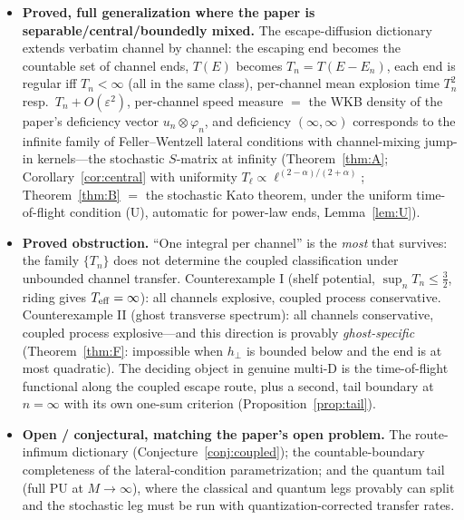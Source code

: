 \documentclass[11pt]{article}
\theoremstyle{remark}
\begin{document}
\begin{itemize}
\item \textbf{Proved, full generalization where the paper is
separable/central/boundedly mixed.}  The escape-diffusion dictionary
extends verbatim channel by channel: the escaping end becomes the
countable set of channel ends, $T(E)$ becomes $T_{n}=T(E-E_{n})$, each
end is regular iff $T_{n}<\infty$ (all in the same class), per-channel
mean explosion time $T_{n}^{2}$ resp.\ $T_{n}+O(\varepsilon^{2})$,
per-channel speed measure $=$ the WKB density of the paper's deficiency
vector $u_{n}\otimes\varphi_{n}$, and deficiency $(\infty,\infty)$
corresponds to the infinite family of Feller--Wentzell lateral
conditions with channel-mixing jump-in kernels---the stochastic
$S$-matrix at infinity (Theorem~\ref{thm:A}; Corollary~\ref{cor:central}
with uniformity $T_{\ell}\propto\ell^{(2-\alpha)/(2+\alpha)}$;
Theorem~\ref{thm:B} $=$ the stochastic Kato theorem, under the uniform
time-of-flight condition (U), automatic for power-law ends,
Lemma~\ref{lem:U}).
\item \textbf{Proved obstruction.}  ``One integral per channel'' is the
\emph{most} that survives: the family $\{T_{n}\}$ does not determine
the coupled classification under unbounded channel transfer.
Counterexample I (shelf potential, $\sup_n T_n\le\frac32$, riding gives
$T_{\rm eff}=\infty$): all channels explosive, coupled process
conservative.  Counterexample II (ghost transverse spectrum): all
channels conservative, coupled process explosive---and this direction
is provably \emph{ghost-specific} (Theorem~\ref{thm:F}: impossible when
$h_{\perp}$ is bounded below and the end is at most quadratic).  The
deciding object in genuine multi-D is the time-of-flight functional
along the coupled escape route, plus a second, tail boundary at
$n=\infty$ with its own one-sum criterion
(Proposition~\ref{prop:tail}).
\item \textbf{Open / conjectural, matching the paper's open problem.}
The route-infimum dictionary (Conjecture~\ref{conj:coupled}); the
countable-boundary completeness of the lateral-condition
parametrization; and the quantum tail (full PU at $M\to\infty$), where
the classical and quantum legs provably can split and the stochastic
leg must be run with quantization-corrected transfer rates.
\end{itemize}
\end{document}
